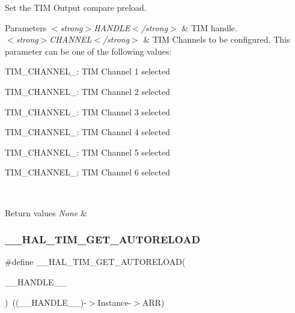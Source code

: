 Set the T\+IM Output compare preload. 


\begin{DoxyParams}{Parameters}
{\em $<$strong$>$\+H\+A\+N\+D\+L\+E$<$/strong$>$} & T\+IM handle. \\
\hline
{\em $<$strong$>$\+C\+H\+A\+N\+N\+E\+L$<$/strong$>$} & T\+IM Channels to be configured. This parameter can be one of the following values\+: \begin{DoxyItemize}
\item T\+I\+M\+\_\+\+C\+H\+A\+N\+N\+E\+L\+\_\+: T\+IM Channel 1 selected \item T\+I\+M\+\_\+\+C\+H\+A\+N\+N\+E\+L\+\_\+: T\+IM Channel 2 selected \item T\+I\+M\+\_\+\+C\+H\+A\+N\+N\+E\+L\+\_\+: T\+IM Channel 3 selected \item T\+I\+M\+\_\+\+C\+H\+A\+N\+N\+E\+L\+\_\+: T\+IM Channel 4 selected \item T\+I\+M\+\_\+\+C\+H\+A\+N\+N\+E\+L\+\_\+: T\+IM Channel 5 selected \item T\+I\+M\+\_\+\+C\+H\+A\+N\+N\+E\+L\+\_\+: T\+IM Channel 6 selected \end{DoxyItemize}
\\
\hline
\end{DoxyParams}

\begin{DoxyRetVals}{Return values}
{\em None} & \\
\hline
\end{DoxyRetVals}
\mbox{\label{group___t_i_m___exported___macros_gaa7a5c7645695bad15bacd402513a028a}} 
\subsubsection{\texorpdfstring{\_\_HAL\_TIM\_GET\_AUTORELOAD}{\_\_HAL\_TIM\_GET\_AUTORELOAD}}
{\footnotesize\ttfamily \#define \+\_\+\+\_\+\+H\+A\+L\+\_\+\+T\+I\+M\+\_\+\+G\+E\+T\+\_\+\+A\+U\+T\+O\+R\+E\+L\+O\+AD(\begin{DoxyParamCaption}\item[{}]{\+\_\+\+\_\+\+H\+A\+N\+D\+L\+E\+\_\+\+\_\+ }\end{DoxyParamCaption})~((\+\_\+\+\_\+\+H\+A\+N\+D\+L\+E\+\_\+\+\_\+)-\/$>$Instance-\/$>$A\+RR)}



